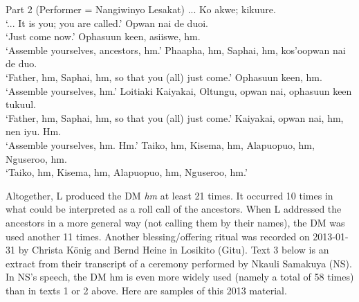 \documentclass[output=paper,colorlinks,citecolor=brown]{langscibook}
\begin{document}

\ea    Part 2 (Performer = Nangiwinyo Lesakat)
        \ea   ... Ko akwe; kikuure.\\
              `... It is you; you are called.'
        \ex    Opwan nai de duoi.\\
               `Just come now.'
        \ex    Ophasuun keen, asiiswe, hm.\\
               `Assemble yourselves, ancestors, hm.'
        \ex    Phaapha, hm, Saphai, hm, kos’oopwan nai de duo.\\
               `Father, hm, Saphai, hm, so that you (all) just come.'
        \ex    Ophasuun keen, hm.\\
               `Assemble yourselves, hm.'
        \ex    Loitiaki Kaiyakai, Oltungu, opwan nai, ophasuun keen tukuul.\\
               `Father, hm, Saphai, hm, so that you (all) just come.'
        \ex    Kaiyakai, opwan nai, hm, nen iyu. Hm.\\
               `Assemble yourselves, hm. Hm.'
        \ex    Taiko, hm, Kisema, hm, Alapuopuo, hm, Nguseroo, hm.\\
              `Taiko, hm, Kisema, hm, Alapuopuo, hm, Nguseroo, hm.'
    \z
\z

Altogether, L produced the DM \textit{hm} at least 21 times. It occurred 10 times in what could be interpreted as a roll call of the ancestors. When L addressed the ancestors in a more general way (not calling them by their names), the DM was used another 11 times.
Another blessing/offering ritual was recorded on 2013-01-31 by Christa König and Bernd Heine in Losikito (Gitu). Text 3 below is an extract from their transcript of a ceremony performed by Nkauli Samakuya (NS). In NS’s speech, the DM hm is even more widely used (namely a total of 58 times) than in texts 1 or 2 above. Here are samples of this 2013 material.
\end{document}
